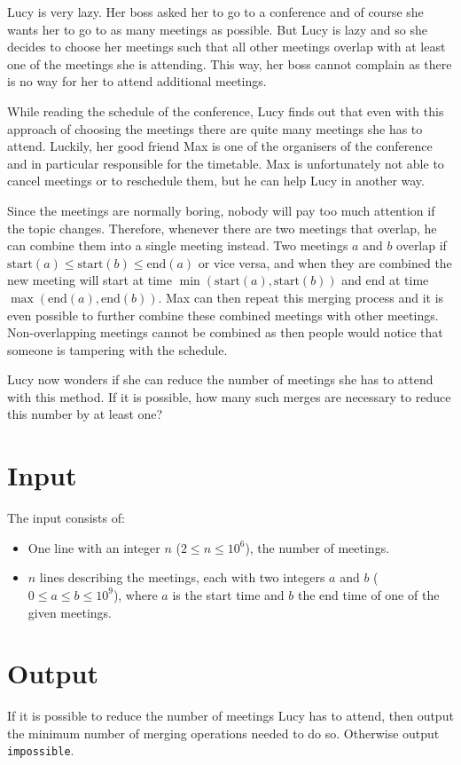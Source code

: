 Lucy is very lazy. Her boss asked her to go to a conference and of course
she wants her to go to as many meetings as possible. But Lucy is lazy and
so she decides to choose her meetings such that all other meetings overlap with
at least one of the meetings she is attending. This way, her boss cannot
complain as there is no way for her to attend additional meetings.

While reading the schedule of the conference, Lucy finds out that even with this
approach of choosing the meetings there are quite many meetings she has to attend.
Luckily, her good friend Max is one of the organisers of the conference and in
particular responsible for the timetable. Max is unfortunately not able to
cancel meetings or to reschedule them, but he can help Lucy in another way.

Since the meetings are normally boring, nobody will pay too much attention if the
topic changes. Therefore, whenever there are two meetings that overlap, he can combine
them into a single meeting instead. Two meetings $a$ and $b$ overlap if
$\text{start}(a) \le \text{start}(b) \le \text{end}(a)$ or vice versa, and when
they are combined the new meeting will start at time
$\min(\text{start}(a),\text{start}(b))$ and end at time
$\max(\text{end}(a),\text{end}(b))$. Max can then repeat this merging process
and it is even possible to further combine these combined meetings with other
meetings. Non-overlapping meetings cannot be combined as then people would notice
that someone is tampering with the schedule.

Lucy now wonders if she can reduce the number of meetings she has to attend
with this method. If it is possible, how many such merges are necessary to
reduce this number by at least one?

\section*{Input}
The input consists of:
\begin{itemize}
	\item One line with an integer $n$ ($2 \leq n \leq 10^6$), the number of
	meetings.
	\item $n$ lines describing the meetings, each with two integers $a$ and $b$ ($0 \leq a \leq b \leq
	10^9$), where $a$ is the start time and $b$ the end time of one of the given
		meetings.
\end{itemize}


\section*{Output}
If it is possible to reduce the number of meetings Lucy has to attend, then
output the minimum number of merging operations needed to do so. Otherwise output
\texttt{impossible}.
